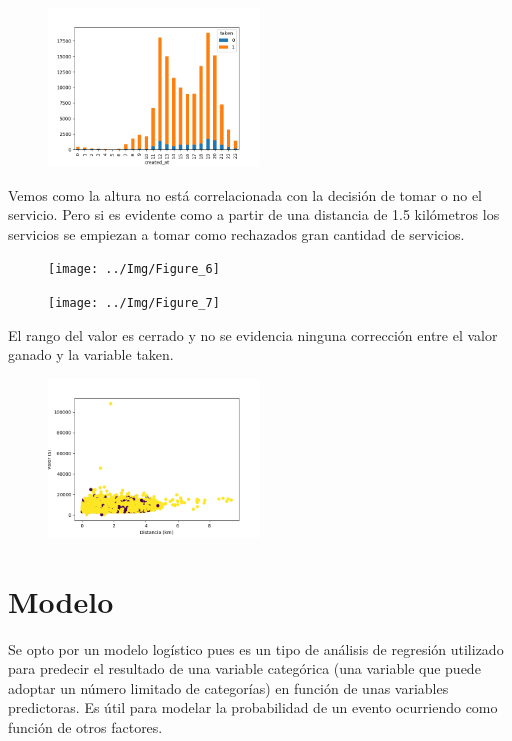 \documentclass[10pt,a4paper]{article}
\begin{document}
		\begin{figure}[h]
			\centering
			\includegraphics[width=0.5\textwidth]{../Img/Figure_3}
		\end{figure}
		Vemos como la altura no está correlacionada con la decisión de tomar o no el servicio. Pero si es evidente como a partir de una distancia de 1.5 kilómetros los servicios se empiezan a tomar como rechazados gran cantidad de servicios.\\
		
		\begin{figure}[h]
			\centering
			\texttt{[image: ../Img/Figure\_6]}
		\end{figure}
			
		\begin{figure}[h]
			\centering
			\texttt{[image: ../Img/Figure\_7]}
		\end{figure}
		El rango del valor es cerrado y no se evidencia ninguna corrección entre el valor ganado y la variable taken.
		\begin{figure}[h]
			\centering
			\includegraphics[width=0.5\textwidth]{../Img/Figure_5}
		\end{figure}
	\section{Modelo}	
		Se opto por un modelo logístico pues es un tipo de análisis de regresión utilizado para predecir el resultado de una variable categórica (una variable que puede adoptar un número limitado de categorías) en función de unas variables predictoras. Es útil para modelar la probabilidad de un evento ocurriendo como función de otros factores.\\
		
\end{document}
